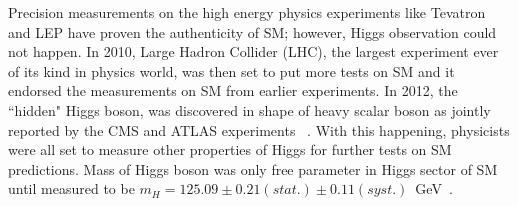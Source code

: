 Precision measurements on the high energy physics experiments like Tevatron and LEP have proven the authenticity of SM; however, Higgs observation could not happen. 
In 2010, Large Hadron Collider (LHC), the largest experiment ever of its kind in physics world, was then set to put more tests on SM and it endorsed the measurements on SM from earlier experiments. In 2012, the ``hidden" Higgs boson, was discovered in shape of heavy scalar boson as jointly reported by the CMS and ATLAS experiments ~\cite{Reference20,Reference21}. With this happening, physicists were all set to measure other properties of Higgs for further tests on SM predictions. 
Mass of Higgs boson was only free parameter in Higgs sector of SM until measured to be $m_H = 125.09\pm 0.21(stat.)\pm0.11(syst.)$~GeV~\cite{higgsCombMass}.

